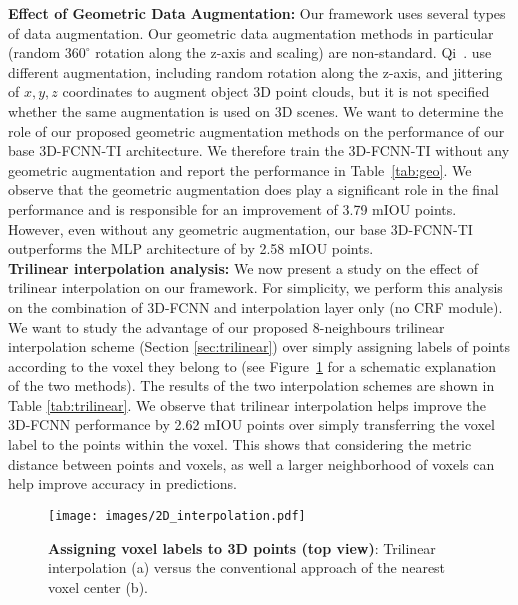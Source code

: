 \documentclass[10pt,twocolumn,letterpaper]{article}
\newcommand{\threedfcnn}[0]{3D-FCNN\xspace}
\newcommand{\crf}[0]{CRF\xspace}
\begin{document}
\textbf{Effect of Geometric Data Augmentation:} Our framework uses several types of data augmentation. Our geometric data augmentation methods in particular (random $360^{\circ}$ rotation along the z-axis and scaling) are non-standard. Qi~\etal. \cite{DBLP:journals/corr/QiSMG16} use  different augmentation, including random rotation along the z-axis, and jittering of $x, y, z$ coordinates to augment object 3D point clouds, but it is not specified whether the same augmentation is used on 3D scenes. We want to determine the role of our proposed geometric augmentation methods on the performance of our base \threedfcnn-TI architecture. We therefore train the \threedfcnn-TI without any geometric augmentation and report the performance in Table~\ref{tab:geo}. We observe that the geometric augmentation does play a significant role in the final performance and is responsible for an improvement of 3.79 mIOU points. However, even without any geometric augmentation, our base \threedfcnn-TI outperforms the MLP architecture of \cite{DBLP:journals/corr/QiSMG16} by 2.58 mIOU points.\\

\textbf{Trilinear interpolation analysis:} We now present a study on the effect of trilinear interpolation on our framework. For simplicity, we perform this analysis on the combination of \threedfcnn and interpolation layer only (no \crf module). We want to study the advantage of our proposed 8-neighbours trilinear interpolation scheme (Section \ref{sec:trilinear}) over simply assigning labels of points according to the voxel they belong to (see Figure~\ref{fig:2DInterpol} for a schematic explanation of the two methods). The results of the two interpolation schemes are shown in Table \ref{tab:trilinear}. We observe that trilinear interpolation helps improve the \threedfcnn performance by 2.62 mIOU points over simply transferring the voxel label to the points within the voxel. This shows that considering the metric distance between points and voxels, as well a larger neighborhood of voxels can help improve accuracy in predictions.

\begin{figure}[t]
\centering
\texttt{[image: images/2D\_interpolation.pdf]}
\captionsetup{justification=centering}
\caption{\small{\textbf{Assigning voxel labels to 3D points (top view)}: Trilinear interpolation (a) versus the conventional approach of the nearest voxel center (b).}}
\label{fig:2DInterpol}
\vspace{-4mm}
\end{figure}  
\end{document}
